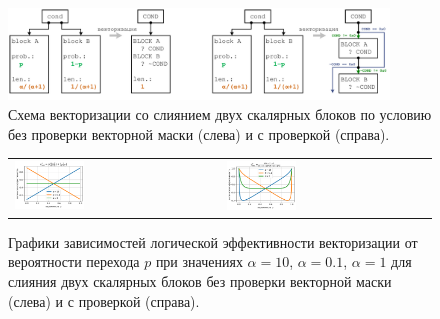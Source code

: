 \documentclass[a4paper,14pt]{extarticle}                     %
\theoremstyle{plain}                                         %
\begin{document}
\begin{figure}[!ht]
\centering
\includegraphics[width=0.9\textwidth]{./fig/vec_ifconv_nocheck_check.pdf}
\singlespacing
\caption{Схема векторизации со слиянием двух скалярных блоков по условию без проверки векторной маски (слева) и с проверкой (справа).}
\label{fig:vec_ifconv_nocheck_check}
\end{figure}

\begin{figure}[!ht]
\centering
\begin{tabular}{ll}
	\includegraphics[width=0.35\textwidth]{./pics/text_4_vec_mrg_under_cond/chart_e_merged.png}
	&
	\includegraphics[width=0.35\textwidth]{./pics/text_4_vec_check_mask/chart_e_merged.png}
\end{tabular}
\singlespacing
\caption{Графики зависимостей логической эффективности векторизации от вероятности перехода $p$ при значениях $\alpha = 10$, $\alpha = 0.1$, $\alpha = 1$ для слияния двух скалярных блоков без проверки векторной маски (слева) и с проверкой (справа).}
\label{fig:text_4_vec_under_cond_chart_e_merged}
\end{figure}
\end{document}
